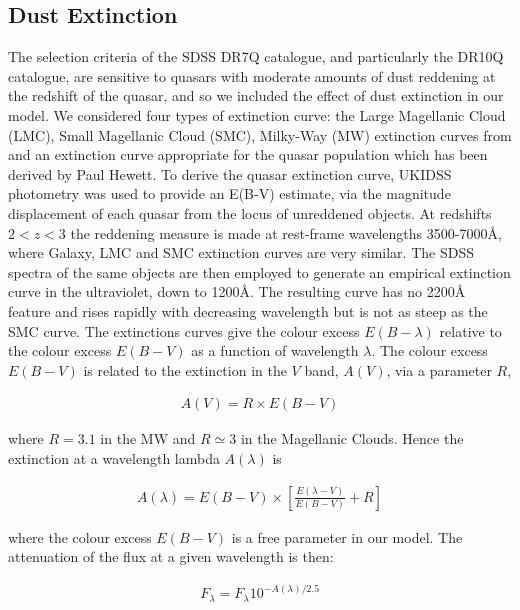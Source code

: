 \subsection{Dust Extinction}
\label{sec:sed-extinction} 

The selection criteria of the SDSS DR7Q catalogue, and particularly the DR10Q catalogue, are sensitive to quasars with moderate amounts of dust reddening \citep[possibly as high as E(B-V) $\sim$ 0.5;][]{richards03} at the redshift of the quasar, and so we included the effect of dust extinction in our model. 
We considered four types of extinction curve: the Large Magellanic Cloud (LMC), Small Magellanic Cloud (SMC), Milky-Way (MW) extinction curves from \citet{pei92} and an extinction curve appropriate for the quasar population which has been derived by Paul Hewett. 
To derive the quasar extinction curve, UKIDSS photometry was used to provide an E(B-V) estimate, via the magnitude displacement of each quasar from the locus of unreddened objects. 
At redshifts $2 < z < 3$ the reddening measure is made at rest-frame wavelengths 3500-7000\AA, where Galaxy, LMC and SMC extinction curves are very similar. 
The SDSS spectra of the same objects are then employed to generate an empirical extinction curve in the ultraviolet, down to 1200\AA. 
The resulting curve has no 2200\AA~ feature and rises rapidly with decreasing wavelength but is not as steep as the SMC curve. 
The extinctions curves give the colour excess $E(B-\lambda)$ relative to the colour excess $E(B-V)$ as a function of wavelength $\lambda$. 
The colour excess $E(B-V)$ is related to the extinction in the $V$ band, $A(V)$, via a parameter $R$, 

\begin{eqnarray}
  A(V) = R \times E(B -V )
\end{eqnarray}

where $R = 3.1$ in the MW and $R \simeq 3$ in the Magellanic Clouds. 
Hence the extinction at a wavelength lambda $A(\lambda)$ is 

\begin{eqnarray}
  A(\lambda) = E(B-V) \times \left[ \frac{E(\lambda-V)}{E(B-V)} + R \right] 
\end{eqnarray}

where the colour excess $E(B-V)$ is a free parameter in our model. 
The attenuation of the flux at a given wavelength is then:

\begin{eqnarray}
  F_\lambda = F_\lambda10^{-A(\lambda)/2.5}
\end{eqnarray}

